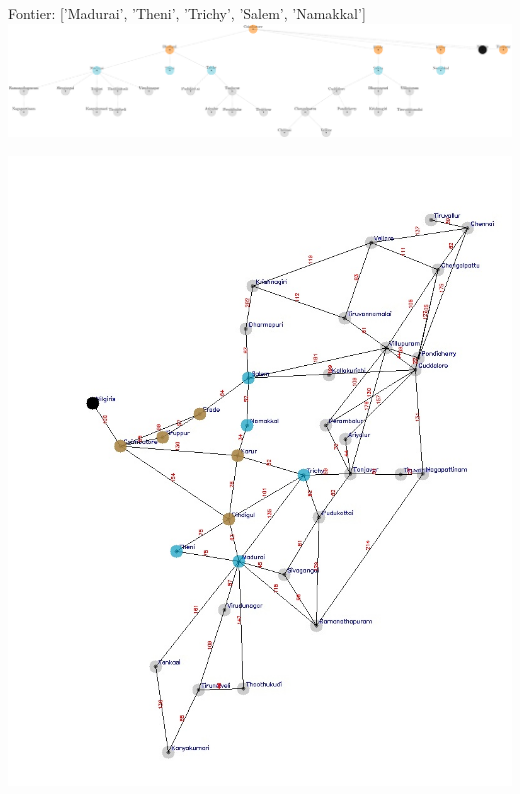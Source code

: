 \documentclass[xcolor=table]{beamer}
\begin{document}
\begin{frame}
  { \tiny Fontier: ['Madurai', 'Theni', 'Trichy', 'Salem', 'Namakkal'] }
  \includegraphics[width=1\textwidth]{../BFSNodes/9-1.png}
  \begin{center}
    \includegraphics[height=0.6\textheight]{../BFSoutput/tamilBFS7.jpg}
  \end{center}
\end{frame}
\end{document}
